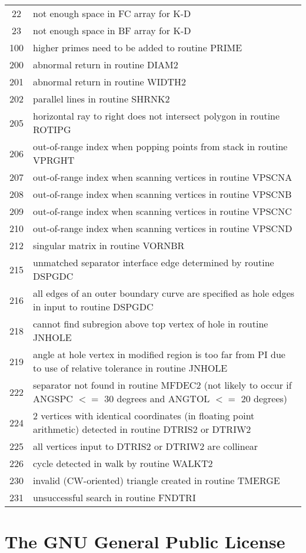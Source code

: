 \begin{appendix}
{\begin{tabular}[h]{cp{5.5in}}
  22  &  not enough space in FC array for K-D \\
  23  &  not enough space in BF array for K-D \\
 100  &  higher primes need to be added to routine PRIME \\
 200  &  abnormal return in routine DIAM2 \\
 201  &  abnormal return in routine WIDTH2 \\
 202  &  parallel lines in routine SHRNK2 \\
 205  &  horizontal ray to right does not intersect polygon in routine ROTIPG \\
 206  &  out-of-range index when popping points from stack in routine VPRGHT \\
 207  &  out-of-range index when scanning vertices in routine VPSCNA \\
 208  &  out-of-range index when scanning vertices in routine VPSCNB \\
 209  &  out-of-range index when scanning vertices in routine VPSCNC \\
 210  &  out-of-range index when scanning vertices in routine VPSCND \\
 212  &  singular matrix in routine VORNBR \\
 215  &  unmatched separator interface edge determined by routine DSPGDC \\
 216  &  all edges of an outer boundary curve are specified as hole 
	 edges in input to routine DSPGDC \\
 218  &  cannot find subregion above top vertex of hole in routine JNHOLE \\
 219  &  angle at hole vertex in modified region is too far from PI due 
	 to use of relative tolerance in routine JNHOLE \\
 222  &  separator not found in routine MFDEC2 (not likely to occur if 
	 ANGSPC $<=$ 30 degrees and ANGTOL $<=$ 20 degrees) \\
 224  &  2 vertices with identical coordinates (in floating point arithmetic)
	 detected in routine DTRIS2 or DTRIW2 \\
 225  &  all vertices input to DTRIS2 or DTRIW2 are collinear \\
 226  &  cycle detected in walk by routine WALKT2 \\
 230  &  invalid (CW-oriented) triangle created in routine TMERGE \\
 231  &  unsuccessful search in routine FNDTRI 
\end{tabular}}


\newpage{\pagestyle{empty}\cleardoublepage}

\chapter{The GNU General Public License}
\label{appendix.gnu-license}



\end{appendix}
